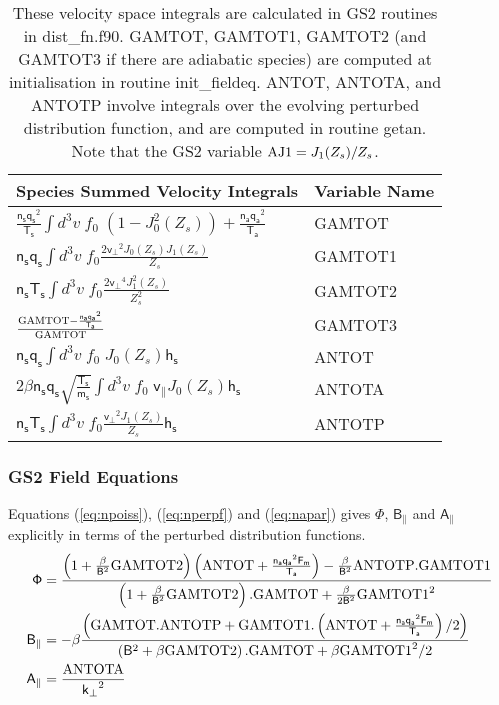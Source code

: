 \documentclass[10pt,a4paper]{article}
\newcommand{\g}[1]{\mathsf{#1}}
\begin{document}
\small
\linespread{2}
\begin{table}[htb]
\begin{center}
\begin{tabular}{|l|l|}
  \hline
  Species Summed Velocity Integrals & Variable Name\\
  \hline
  $\frac{\g{n_s} \g{q_s}^2}{\g{T_s}} \int d^3v \; f_0 \; \left( 1 - J_0^2(Z_s)
  \right) + \frac{\g{n_a} \g{q_a}^2}{\g{T_a}} $ & GAMTOT \\  
  $\g{n_s} \g{q_s}  \int d^3v  \;f_{0}  \frac{2 \g{v_{\perp}}^2 J_0(Z_s)
    J_1(Z_s)}{Z_s}$ & GAMTOT1 \\ 
  $\g{n_s} \g{T_s} \int d^3v \;  f_{0} \frac{2 \g{v_{\perp}}^4
    J_1^2(Z_s)}{Z_s^2}$ & GAMTOT2 \\ 
  $\frac{{\rm GAMTOT} {- \frac{\g{n_a} \g{q_a}^2}{\g{T_a}}}}
    {{\rm GAMTOT}}$ & GAMTOT3 \\ 
    $\g{n_s} \g{q_s} \int d^3v \;f_0 \; J_0(Z_s)  \g{h_s}$ & ANTOT \\
    $2 \g{\beta} \g{n_s} \g{q_s} \sqrt{\frac{\g{T_s}}{\g{m_s}}} \int d^3v \;
    f_0 \; \g{v_{\parallel}} J_0(Z_s) \g{h_s}$ & ANTOTA \\ 
    $\g{n_s} \g{T_s} \int d^3v \; f_0  \frac{\g{v_{\perp}}^2 J_1(Z_s)}{Z_s}
    \g{h_s}$ & ANTOTP \\
    \hline
\end{tabular}
\caption{\label{tab:gs2_vints} These velocity space integrals are calculated
  in GS2 routines in dist\_fn.f90.  GAMTOT, GAMTOT1, GAMTOT2 (and GAMTOT3 if
  there are adiabatic species) are computed at initialisation in routine
  init\_fieldeq. ANTOT, ANTOTA, and ANTOTP involve integrals over the evolving
  perturbed distribution function, and are computed in routine getan. Note
  that the GS2 variable ${\rm AJ1} = J_1(Z_s)/Z_s$.}
\end{center}
\end{table}
\linespread{1}

\subsubsection{GS2 Field Equations}
Equations (\ref{eq:npoiss}), (\ref{eq:nperpf}) and (\ref{eq:napar}) gives
$\g{\Phi}$, $\g{B_{\parallel}}$ and $\g{A_{\parallel}}$ explicitly in terms of
the perturbed distribution functions.
\begin{align} 
  \g{\Phi} & = \frac{\left( 1 + \frac{\g{\beta}}{\g{B}^2} {\rm GAMTOT2}
    \right) \left( {\rm ANTOT} + \frac{\g{n_a} \g{q_a}^2 \g{F_m}}{\g{T_a}}
    \right) - \frac{\g{\beta}}{\g{B}^2} {\rm ANTOTP}.{\rm GAMTOT1}} {\left( 1
      + \frac{\g{\beta}}{\g{B}^2} {\rm GAMTOT2} \right).{\rm GAMTOT} +
    \frac{\g{\beta}}{2\g{B}^2} {\rm GAMTOT1}^2} \label{eq:phigs2}\\
  \g{B_{\parallel}} & = -\g{\beta} \frac{\left( {\rm GAMTOT}.{\rm ANTOTP} +
      {\rm GAMTOT1}.\left( {\rm ANTOT} + \frac{\g{n_a} \g{q_a}^2
          \g{F_m}}{\g{T_a}} \right)/2 \right) } {\left( \g{B}^2 + \g{\beta}
      {\rm GAMTOT2} \right) .{\rm GAMTOT} +
    \g{\beta} {\rm GAMTOT1}^2/2} \label{eq:bpargs2}\\
  \g{A_{\parallel}} & = \frac{{\rm
      ANTOTA}}{\g{k_{\perp}}^2} \label{eq:apargs2}
\end{align}
\end{document}
